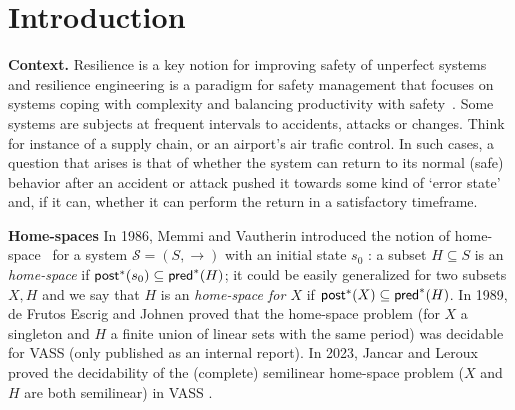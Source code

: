 \section{Introduction}\label{section introduction}


{\bf Context.} 
Resilience is a key notion for improving safety of unperfect systems and resilience engineering is a paradigm for safety management that focuses on systems coping with complexity and balancing productivity with safety~\cite{challenges}. Some systems are subjects at frequent intervals to accidents, attacks or changes. Think for instance of a supply chain, or an airport’s air trafic control. In such cases, a question that arises is that of whether the system can return to its normal (safe) behavior after an accident or attack
pushed it towards some kind of ‘error state’ and, if it can, whether it can perform the return in a satisfactory timeframe. 
%


{\bf Home-spaces}
 In 1986, Memmi and Vautherin introduced the notion of home-space~\cite{DBLP:conf/ac/MemmiV86} for a system $\mathscr{S} = (S,\rightarrow )$ with an initial state $s_0$ : a subset $H \subseteq S$ is an \emph{home-space}  if 
$\textsf{post}^*(s_0) \subseteq \textsf{pred}^*(H)$; it could be easily generalized for two subsets $X,H$ and we say that $H$ is an \emph{home-space for $X$} if $\textsf{post}^*(X) \subseteq \textsf{pred}^*(H)$. In 1989, de Frutos Escrig and Johnen proved that the home-space problem (for $X$ a singleton and $H$ a finite union of linear sets with the same period) was decidable for VASS (only published as an internal report). In 2023, Jancar and Leroux proved the decidability of the (complete) semilinear home-space problem ($X$ and $H$ are both semilinear)  in VASS \cite{DBLP:journals/corr/abs-2207-02697}.

